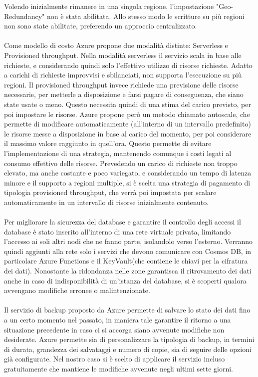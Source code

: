 Volendo inizialmente rimanere in una singola regione,
l'impostazione "Geo-Redundancy" non è stata abilitata.
Allo stesso modo le scritture su più regioni non sono state abilitate,
preferendo un approccio centralizzato.\\
\\
Come modello di costo Azure propone due modalità distinte: Serverless e Provisioned throughput.
Nella modalità serverless il servizio scala in base alle richieste,
e considerando quindi solo l'effettivo utilizzo di risorse richieste.
Adatto a carichi di richieste improvvisi e sbilanciati,
non supporta l'esecuzione su più regioni.
Il provisioned throughput invece richiede una previsione delle risorse necessarie,
per metterle a disposizione e farsi pagare di conseguenza, che siano state usate o meno.
Questo necessita quindi di una stima del carico previsto,
per poi impostare le risorse.
Azure propone però un metodo chiamato autoscale,
che permette di modificare automaticamente (all'interno di un intervallo predefinito)
le risorse messe a disposizione in base al carico del momento,
per poi considerare il massimo valore raggiunto in quell'ora.
Questo permette di evitare l'implementazione di una strategia,
mantenendo comunque i costi legati al consumo effettivo delle risorse.
Prevedendo un carico di richieste non troppo elevato,
ma anche costante e poco variegato,
e considerando un tempo di latenza minore e il supporto a regioni multiple,
si è scelta una strategia di pagamento di tipologia provisioned throughput,
che verrà poi impostata per scalare automaticamente in un intervallo di risorse inizialmente contenuto.\\
\\
Per migliorare la sicurezza del database e garantire il controllo degli accessi
il database è stato inserito all'interno di una rete virtuale privata,
limitando l'accesso ai soli altri nodi che ne fanno parte,
isolandolo verso l'esterno.
Verranno quindi aggiunti alla rete solo i servizi che devono comunicare con Cosmos DB,
in particolare Azure Functions e il KeyVault(che contiene le chiavi per la cifratura dei dati).
Nonostante la ridondanza nelle zone garantisca il ritrovamento dei dati
anche in caso di indisponibilità di un'istanza del database,
si è scoperti qualora avvengano modifiche erronee o malintenzionate.\\
\\
Il servizio di backup proposto da Azure permette di salvare lo stato dei dati
fino a un certo momento nel passato,
in maniera tale garantire il ritorno a una situazione precedente
in caso ci si accorga siano avvenute modifiche non desiderate.
Azure permette sia di personalizzare la tipologia di backup,
in termini di durata, grandezza dei salvataggi e numero di copie,
sia di seguire delle opzioni già configurate.
Nel nostro caso si è scelto di applicare il servizio incluso gratuitamente
che mantiene le modifiche avvenute negli ultimi sette giorni.\\



